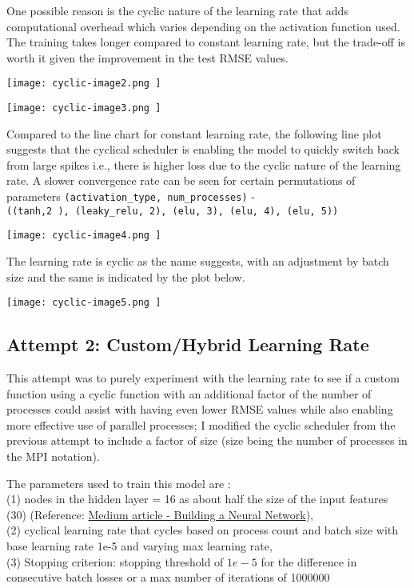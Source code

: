 \documentclass{article}
\begin{document}
One possible reason is the cyclic nature of the learning rate that adds computational overhead which varies depending on the activation function used. The training takes longer compared to constant learning rate, but the trade-off is worth it given the improvement in the test RMSE values.

\begin{center}
\texttt{[image: cyclic-image2.png ]}
\end{center}

\begin{center}
\texttt{[image: cyclic-image3.png ]}
\end{center}

Compared to the line chart for constant learning rate, the following line plot suggests that the cyclical scheduler is enabling the model to quickly switch back from large spikes i.e., there is higher loss due to the cyclic nature of the learning rate. A slower convergence rate can be seen for  certain permutations of parameters \verb|(activation_type, num_processes)| - \\ \verb|((tanh,2 ), (leaky_relu, 2), (elu, 3), (elu, 4), (elu, 5))|

\begin{center}
\texttt{[image: cyclic-image4.png ]}
\end{center}

The learning rate is cyclic as the name suggests, with an adjustment by batch size and the same is indicated by the plot below.

\begin{center}
\texttt{[image: cyclic-image5.png ]}
\end{center}

\subsection {Attempt 2: Custom/Hybrid Learning Rate }
This attempt was to purely experiment with the learning rate to see if a custom function using a cyclic function with an additional factor of the number of processes could assist with having even lower RMSE values while also enabling more effective use of parallel processes; I modified the cyclic scheduler from the previous attempt to include a factor of size (size being the number of processes in the MPI notation).

The parameters used to train this model are : \\
(1) nodes in the hidden layer = 16 as about half the size of the input features (30) (Reference: \href{https://medium.com/data-science/17-rules-of-thumb-for-building-a-neural-network-93356f9930af}{Medium article - Building a Neural Network}), \\
(2) cyclical learning rate that cycles based on process count and batch size with base learning rate 1e-5 and varying max learning rate, \\
(3) Stopping criterion: stopping threshold of $1e-5$ for the difference in consecutive batch losses or a max number of iterations of 1000000
\end{document}
